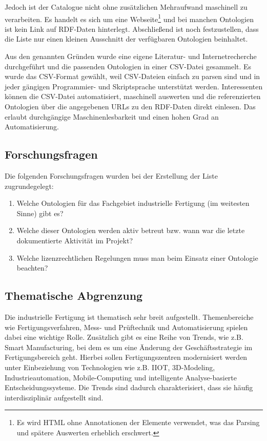 \documentclass{article}
\begin{document}
Jedoch ist der Catalogue nicht ohne zusätzlichen Mehraufwand maschinell zu verarbeiten.
Es handelt es sich um eine Webseite\footnote{Es wird HTML ohne Annotationen der Elemente verwendet, was das Parsing und spätere Auswerten erheblich erschwert.} und bei manchen Ontologien ist kein Link auf RDF-Daten hinterlegt. Abschließend ist noch festzustellen, dass die Liste nur einen kleinen Ausschnitt der verfügbaren Ontologien beinhaltet.

Aus den genannten Gründen wurde eine eigene Literatur- und Internetrecherche durchgeführt und die passenden Ontologien in einer CSV-Datei gesammelt.
Es wurde das CSV-Format gewählt, weil CSV-Dateien einfach zu parsen sind und in jeder gängigen Programmier- und Skriptsprache unterstützt werden.
Interessenten können die CSV-Datei automatisiert, maschinell auswerten und die referenzierten Ontologien über die angegebenen URLs zu den RDF-Daten direkt einlesen.
Das erlaubt durchgängige Maschinenlesbarkeit und einen hohen Grad an Automatisierung.

\subsection{Forschungsfragen}

Die folgenden Forschungsfragen wurden bei der Erstellung der Liste zugrundegelegt:

\begin{enumerate}
    \item Welche Ontologien für das Fachgebiet industrielle Fertigung (im weitesten Sinne) gibt es?
    \item Welche dieser Ontologien werden aktiv betreut bzw. wann war die letzte dokumentierte Aktivität im Projekt?
    \item Welche lizenzrechtlichen Regelungen muss man beim Einsatz einer Ontologie beachten?
\end{enumerate}

\subsection{Thematische Abgrenzung}

Die industrielle Fertigung ist thematisch sehr breit aufgestellt.
Themenbereiche wie Fertigungsverfahren, Mess- und Prüftechnik und Automatisierung spielen dabei eine wichtige Rolle.
Zusätzlich gibt es eine Reihe von Trends, wie z.B. Smart Manufacturing, bei dem es um eine Änderung der Geschäftsstrategie im Fertigungsbereich geht.
Hierbei sollen Fertigungszentren modernisiert werden unter Einbeziehung von Technologien wie z.B. IIOT, 3D-Modeling, Industrieautomation, Mobile-Computing und intelligente Analyse-basierte Entscheidungssysteme.
Die Trends sind dadurch charakterisiert, dass sie häufig interdisziplinär aufgestellt sind.
\end{document}
